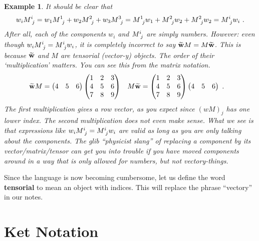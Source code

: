 \documentclass[12pt]{article}
\newtheorem{example}{Example}[section]
\begin{document}
\begin{example}\label{eg:moving:coefficients:around}
It should be clear that
\begin{align}
    w_i M\aij{i}{j} = 
    w_1 M\aij{1}{j} + w_2 M\aij{2}{j} + w_3 M\aij{3}{j}
    = 
    M\aij{1}{j}w_1  + M\aij{2}{j}w_2 + M\aij{2}{j}w_2
    =
    M\aij{i}{j}w_i \ .
\end{align}
After all, each of the components $w_i$ and $M\aij{i}{j}$ are simply numbers. However: even though $w_i M\aij{i}{j} = M\aij{i}{j}w_i$, it is \emph{completely incorrect} to say $\widetilde{\mathbf{w}}M = M\widetilde{\mathbf{w}}$. This is because $\widetilde{\mathbf{w}}$ and $M$ are \emph{tensorial} (vector-y) objects. The order of their `multiplication' matters. You can see this from the matrix notation.
\begin{align}
    \widetilde{\mathbf{w}}M &= 
    \begin{pmatrix}
        4&5&6
    \end{pmatrix}
    \begin{pmatrix}
        1 & 2 & 3 \\
        4 & 5 & 6 \\
        7 & 8 & 9
    \end{pmatrix}
    &
    M\widetilde{\mathbf{w}} &=
    \begin{pmatrix}
        1 & 2 & 3 \\
        4 & 5 & 6 \\
        7 & 8 & 9
    \end{pmatrix}
    \begin{pmatrix}
        4&5&6
    \end{pmatrix} \ .
\end{align}
The first multiplication gives a row vector, as you expect since $(wM)_j$ has one lower index. The second multiplication does not even make sense. What we see is that expressions like $w_i M\aij{i}{j} = M\aij{i}{j}w_i$ are valid as long as you are only talking about the components. The glib ``physicist slang'' of replacing a component by its vector/matrix/tensor can get you into trouble if you have moved components around in a way that is only allowed for numbers, but not vectory-things.
\end{example}

Since the language is now becoming cumbersome, let us define the word \textbf{tensorial} to mean an object with indices. This will replace the phrase ``vectory'' in our notes.

\section{Ket Notation}
\end{document}
